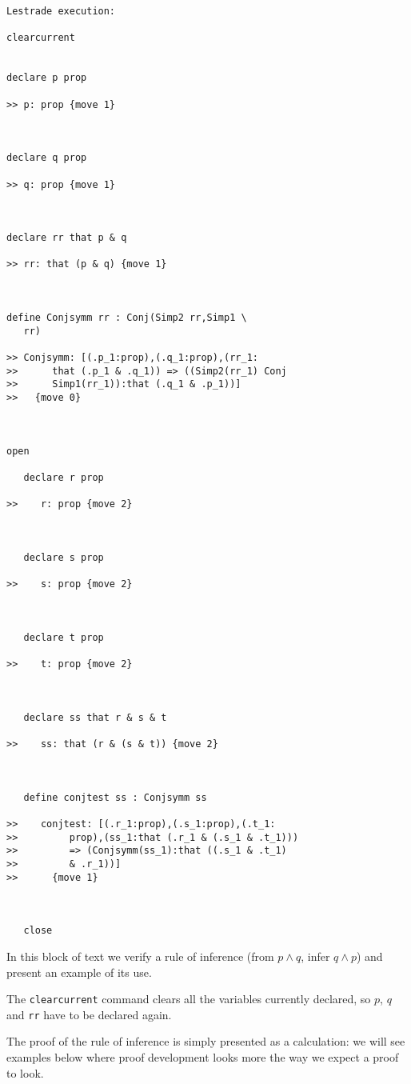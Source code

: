 \documentclass[12pt]{article}
\begin{document}
\begin{verbatim}Lestrade execution:

clearcurrent


declare p prop

>> p: prop {move 1}



declare q prop

>> q: prop {move 1}



declare rr that p & q

>> rr: that (p & q) {move 1}



define Conjsymm rr : Conj(Simp2 rr,Simp1 \
   rr)

>> Conjsymm: [(.p_1:prop),(.q_1:prop),(rr_1:
>>      that (.p_1 & .q_1)) => ((Simp2(rr_1) Conj
>>      Simp1(rr_1)):that (.q_1 & .p_1))]
>>   {move 0}



open

   declare r prop

>>    r: prop {move 2}



   declare s prop

>>    s: prop {move 2}



   declare t prop

>>    t: prop {move 2}



   declare ss that r & s & t

>>    ss: that (r & (s & t)) {move 2}



   define conjtest ss : Conjsymm ss

>>    conjtest: [(.r_1:prop),(.s_1:prop),(.t_1:
>>         prop),(ss_1:that (.r_1 & (.s_1 & .t_1)))
>>         => (Conjsymm(ss_1):that ((.s_1 & .t_1)
>>         & .r_1))]
>>      {move 1}



   close
\end{verbatim}

In this block of text we verify a rule of inference (from $p \wedge q$, infer $q \wedge p$) and present an example of its use.

The {\tt clearcurrent} command clears all the variables currently declared, so $p$, $q$ and {\tt rr} have to be declared again.

The proof of the rule of inference is simply presented as a calculation:  we will see examples below where proof development looks more the way we expect a proof to look.
\end{document}
